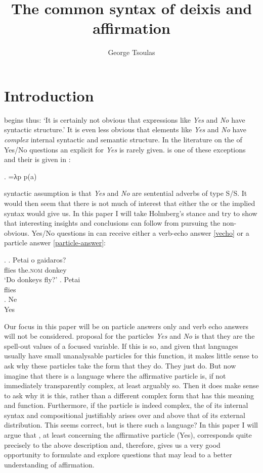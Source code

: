 \documentclass[output=paper]{LSP/langsci}
\title{The common syntax of deixis and affirmation}
\author{George Tsoulas \affiliation{University of York}}
\begin{document}
\section{Introduction} 


\citet{holmberg:15} begins thus: `It is certainly not obvious that expressions like \textit{Yes} and \textit{No} have syntactic structure.'
It is even less obvious that elements like  \textit{Yes} and 
\textit{No} have \textit{complex} internal syntactic and semantic structure.  In the literature on the  of Yes/No questions an explicit  for \textit{Yes} is rarely given. \citet{groenedijk-stokhof:84} is one of these exceptions and their  is given in \Next:

\Lsciex.
=λp p(a)


 syntactic assumption is that \textit{Yes} and \textit{No} are sentential adverbs of type S/S.  It would then seem that there is not much of interest that either the  or the implied syntax would give us.  In this paper I will take Holmberg's stance and try to show that interesting insights and conclusions can follow from pursuing the non-obvious. Yes/No questions in  can receive either a verb-echo answer \ref{vecho} or a particle answer \ref{particle-answer}:

\Lsciex.
\ag.  Petai o gaidaros?\\
 flies the.\textsc{nom}  donkey\\
\glt `Do  donkeys fly?'
\bg. Petai\\
     flies\\ \label{vecho}
\cg. Ne\\
Yes\\ \label{particle-answer}
     

Our focus in this paper will be on particle answers only and verb echo answers will not be considered.    proposal for the particles \textit{Yes} and \textit{No} is that they are the spell-out values of a focused  variable.  If this is so, and given that languages usually have small unanalysable particles for this function, it makes little sense to ask why these particles take the form that they do.  They just do.  But now imagine that there is a language where the affirmative particle is, if not immediately transparently complex, at least arguably so.  Then it does make sense to ask why it is this, rather than a different complex form that has this meaning and  function.  Furthermore, if the particle is indeed complex, the  of its internal syntax and compositional  justifiably arises over and above that of its external distribution.  This seems correct, but is there such a language?  In this paper I will argue that , at least concerning the affirmative particle \nai (Yes), corresponds quite precisely to the above description and, therefore, gives us a very good opportunity to formulate and explore questions that may lead to a better understanding of affirmation.
\end{document}
